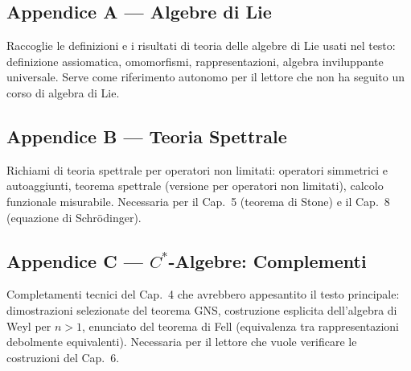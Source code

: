 \documentclass[12pt, a4paper]{article}
\begin{document}
	\subsection*{Appendice A --- Algebre di Lie}
	
	Raccoglie le definizioni e i risultati di teoria delle algebre di Lie usati
	nel testo: definizione assiomatica, omomorfismi, rappresentazioni, algebra
	inviluppante universale. Serve come riferimento autonomo per il lettore che
	non ha seguito un corso di algebra di Lie.
	
	\subsection*{Appendice B --- Teoria Spettrale}
	
	Richiami di teoria spettrale per operatori non limitati: operatori simmetrici e
	autoaggiunti, teorema spettrale (versione per operatori non limitati), calcolo
	funzionale misurabile. Necessaria per il Cap.\ 5 (teorema di Stone) e il Cap.\ 8
	(equazione di Schrödinger).
	
	\subsection*{Appendice C --- $C^*$-Algebre: Complementi}
	
	Completamenti tecnici del Cap.\ 4 che avrebbero appesantito il testo principale:
	dimostrazioni selezionate del teorema GNS, costruzione esplicita dell'algebra di
	Weyl per $n > 1$, enunciato del teorema di Fell (equivalenza tra rappresentazioni
	debolmente equivalenti). Necessaria per il lettore che vuole verificare le
	costruzioni del Cap.\ 6.
	
\end{document}
